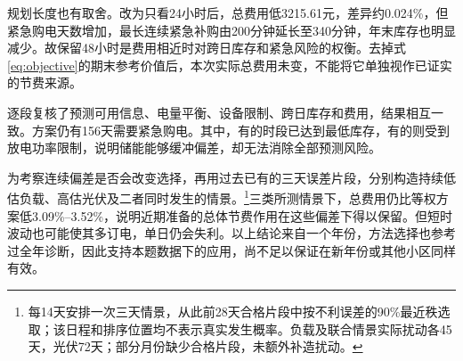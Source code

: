 规划长度也有取舍。改为只看24小时后，总费用低3215.61元，差异约0.024\%，但紧急购电天数增加，最长连续紧急补购由200分钟延长至340分钟，年末库存也明显减少。故保留48小时是费用相近时对跨日库存和紧急风险的权衡。去掉式\eqref{eq:objective}的期末参考价值后，本次实际总费用未变，不能将它单独视作已证实的节费来源。

逐段复核了预测可用信息、电量平衡、设备限制、跨日库存和费用，结果相互一致。方案仍有156天需要紧急购电。其中，有的时段已达到最低库存，有的则受到放电功率限制，说明储能能够缓冲偏差，却无法消除全部预测风险。

为考察连续偏差是否会改变选择，再用过去已有的三天误差片段，分别构造持续低估负载、高估光伏及二者同时发生的情景。\footnote{每14天安排一次三天情景，从此前28天合格片段中按不利误差的90\%最近秩选取；该日程和排序位置均不表示真实发生概率。负载及联合情景实际扰动各45天，光伏72天；部分月份缺少合格片段，未额外补造扰动。}三类所测情景下，总费用仍比等权方案低3.09\%--3.52\%，说明近期准备的总体节费作用在这些偏差下得以保留。但短时波动也可能使其多订电，单日仍会失利。以上结论来自一个年份，方法选择也参考过全年诊断，因此支持本题数据下的应用，尚不足以保证在新年份或其他小区同样有效。
